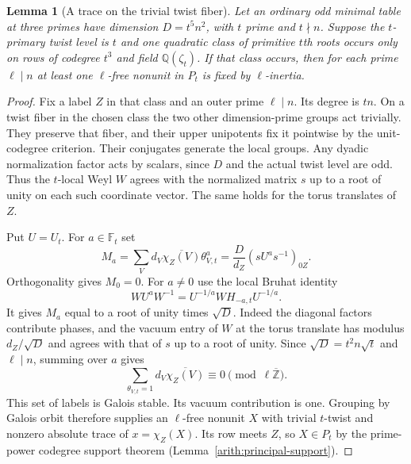 \documentclass[11pt,a4paper]{article}
\numberwithin{equation}{section}
\newtheorem{lemma}[theorem]{Lemma}
\newcommand{\QQ}{\mathbb Q}
\begin{document}
\begin{lemma}[A trace on the trivial twist fiber]\label{red:inactive-trace}
Let an ordinary odd minimal table at three primes have dimension
$D=t^5n^2$, with $t$ prime and $t\nmid n$. Suppose the $t$-primary twist level
is $t$ and one quadratic class of primitive $t$th roots occurs
only on rows of codegree $t^3$ and field $\QQ(\zeta_t)$.
If that class occurs, then for each prime $\ell\mid n$ at least one
$\ell$-free nonunit in $P_t$ is fixed by $\ell$-inertia.
\end{lemma}
\begin{proof}
Fix a label $Z$ in that class and an outer prime $\ell\mid n$.
Its degree is $tn$. On a twist fiber in the chosen class the two
other dimension-prime groups act trivially. They preserve that
fiber, and their upper unipotents fix it pointwise by the
unit-codegree criterion. Their conjugates generate the local groups.
Any dyadic normalization factor acts by scalars, since $D$ and
the actual twist level are odd. Thus the $t$-local Weyl $W$
agrees with the normalized matrix $s$ up to a root of unity on each
such coordinate vector.
The same holds for the torus translates of $Z$.

Put $U=U_t$. For $a\in\mathbb F_t$ set
\[
 M_a=\sum_V d_V\overline{\chi_Z(V)}\theta_{V,t}^{a}
     =\frac{D}{d_Z}(sU^a s^{-1})_{0Z}.
\]
Orthogonality gives $M_0=0$. For $a\ne0$ use the local Bruhat identity
\[
               WU^aW^{-1}=U^{-1/a}WH_{-a,t}U^{-1/a}.
\]
It gives $M_a$ equal to a root of unity times $\sqrt D$. Indeed
the diagonal factors contribute phases, and the vacuum entry of
$W$ at the torus translate has modulus $d_Z/\sqrt D$ and
agrees with that of $s$ up to a root of unity. Since
$\sqrt D=t^2 n\sqrt t$ and $\ell\mid n$, summing over $a$ gives
\[
           \sum_{\theta_{V,t}=1} d_V\overline{\chi_Z(V)}
                      \equiv0\pmod {\ell\overline{\mathbb Z}} .
\]
This set of labels is Galois stable. Its vacuum contribution is
one. Grouping by Galois orbit therefore supplies an $\ell$-free
nonunit $X$ with trivial $t$-twist and nonzero absolute trace of
$x=\chi_Z(X)$. Its row meets $Z$, so $X\in P_t$ by the
prime-power codegree support theorem (Lemma~\ref{arith:principal-support}).


\end{proof}
\end{document}
